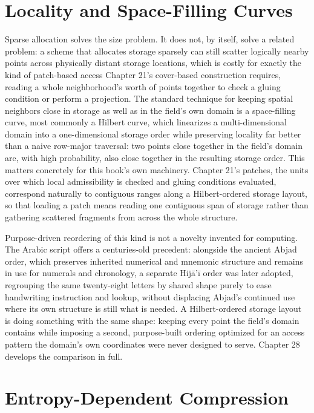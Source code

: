 \section{Locality and Space-Filling Curves}

Sparse allocation solves the size problem. It does not, by itself, solve a related problem: a scheme that allocates storage sparsely can still scatter logically nearby points across physically distant storage locations, which is costly for exactly the kind of patch-based access Chapter 21's cover-based construction requires, reading a whole neighborhood's worth of points together to check a gluing condition or perform a projection. The standard technique for keeping spatial neighbors close in storage as well as in the field's own domain is a space-filling curve, most commonly a Hilbert curve, which linearizes a multi-dimensional domain into a one-dimensional storage order while preserving locality far better than a naive row-major traversal: two points close together in the field's domain are, with high probability, also close together in the resulting storage order. This matters concretely for this book's own machinery. Chapter 21's patches, the units over which local admissibility is checked and gluing conditions evaluated, correspond naturally to contiguous ranges along a Hilbert-ordered storage layout, so that loading a patch means reading one contiguous span of storage rather than gathering scattered fragments from across the whole structure.

Purpose-driven reordering of this kind is not a novelty invented for computing. The Arabic script offers a centuries-old precedent: alongside the ancient Abjad order, which preserves inherited numerical and mnemonic structure and remains in use for numerals and chronology, a separate Hijā'ī order was later adopted, regrouping the same twenty-eight letters by shared shape purely to ease handwriting instruction and lookup, without displacing Abjad's continued use where its own structure is still what is needed. A Hilbert-ordered storage layout is doing something with the same shape: keeping every point the field's domain contains while imposing a second, purpose-built ordering optimized for an access pattern the domain's own coordinates were never designed to serve. Chapter 28 develops the comparison in full.

\section{Entropy-Dependent Compression}

